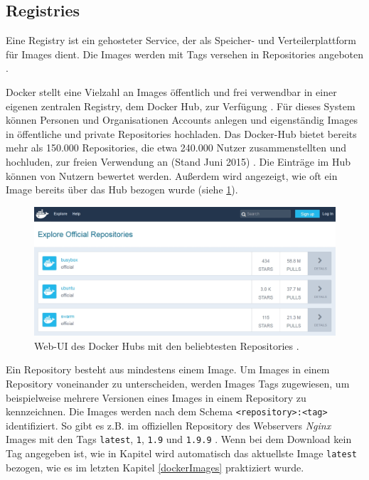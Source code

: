 \documentclass[../main.tex]{subfiles}
\begin{document}

    \subsection{Registries}
      Eine Registry ist ein gehosteter Service, der als Speicher- und Verteilerplattform für Images dient. Die Images werden mit Tags versehen in Repositories angeboten \cite{dockerRegistry}. %

      Docker stellt eine Vielzahl an Images öffentlich und frei verwendbar in einer eigenen zentralen Registry, dem Docker Hub, zur Verfügung \cite[S.11]{dockerBook}\cite[S.3]{dockerSec1}\cite{dockerRegistry}. Für dieses System können Personen und Organisationen Accounts anlegen und eigenständig Images in öffentliche und private Repositories hochladen. Das Docker-Hub bietet bereits mehr als 150.000 Repositories, die etwa 240.000 Nutzer zusammenstellten und hochluden, zur freien Verwendung an (Stand Juni 2015) \cite[S.16]{slideshareDockercon15}. Die Einträge im Hub können von Nutzern bewertet werden. Außerdem wird angezeigt, wie oft ein Image bereits über das Hub bezogen wurde (siehe \fig \ref{fig:intro_registry}).

      \begin{figure}[h]
          \centering
          \includegraphics[width=1.0\textwidth]{./images/intro_registry.jpg}
          \caption{Web-UI des Docker Hubs mit den beliebtesten Repositories \cite{dockerHub}.}
          \label{fig:intro_registry}
      \end{figure}

      Ein Repository besteht aus mindestens einem Image. Um Images in einem Repository voneinander zu unterscheiden, werden Images Tags zugewiesen, um beispielweise mehrere Versionen eines Images in einem Repository zu kennzeichnen. Die Images werden nach dem Schema \texttt{<repository>:<tag>} identifiziert. So gibt es z.B. im offiziellen Repository des Webservers \emph{Nginx} Images mit den Tags \texttt{latest}, \texttt{1}, \texttt{1.9} und \texttt{1.9.9} \cite{dockerHubNginx}. Wenn bei dem Download kein Tag angegeben ist, wie in Kapitel wird automatisch das aktuellste Image \texttt{latest} bezogen, wie es im letzten Kapitel \ref{dockerImages} praktiziert wurde.
\end{document}
